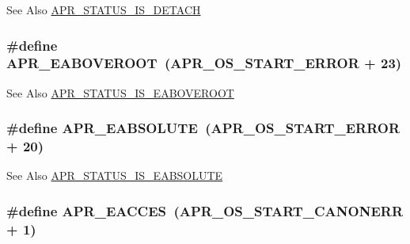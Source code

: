 \begin{DoxySeeAlso}{See Also}
\hyperlink{group___a_p_r___s_t_a_t_u_s___i_s_ga64d5d0a6bfe141a387dfdd430a38465b}{A\-P\-R\-\_\-\-S\-T\-A\-T\-U\-S\-\_\-\-I\-S\-\_\-\-D\-E\-T\-A\-C\-H} 
\end{DoxySeeAlso}
\hypertarget{group___a_p_r___error_ga4828cc04f97dc7bed691456adf7c073e}{
\subsubsection[{A\-P\-R\-\_\-\-E\-A\-B\-O\-V\-E\-R\-O\-O\-T}]{\setlength{\rightskip}{0pt plus 5cm}\#define A\-P\-R\-\_\-\-E\-A\-B\-O\-V\-E\-R\-O\-O\-T~({\bf A\-P\-R\-\_\-\-O\-S\-\_\-\-S\-T\-A\-R\-T\-\_\-\-E\-R\-R\-O\-R} + 23)}}\label{group___a_p_r___error_ga4828cc04f97dc7bed691456adf7c073e}
\begin{DoxySeeAlso}{See Also}
\hyperlink{group___a_p_r___s_t_a_t_u_s___i_s_gae89b8de1e40b855cf95987ce5947b442}{A\-P\-R\-\_\-\-S\-T\-A\-T\-U\-S\-\_\-\-I\-S\-\_\-\-E\-A\-B\-O\-V\-E\-R\-O\-O\-T} 
\end{DoxySeeAlso}
\hypertarget{group___a_p_r___error_gafd1ffc5bf2bf215ad048780408913d0e}{
\subsubsection[{A\-P\-R\-\_\-\-E\-A\-B\-S\-O\-L\-U\-T\-E}]{\setlength{\rightskip}{0pt plus 5cm}\#define A\-P\-R\-\_\-\-E\-A\-B\-S\-O\-L\-U\-T\-E~({\bf A\-P\-R\-\_\-\-O\-S\-\_\-\-S\-T\-A\-R\-T\-\_\-\-E\-R\-R\-O\-R} + 20)}}\label{group___a_p_r___error_gafd1ffc5bf2bf215ad048780408913d0e}
\begin{DoxySeeAlso}{See Also}
\hyperlink{group___a_p_r___s_t_a_t_u_s___i_s_gae662804298416a68e63c4f84f245d30c}{A\-P\-R\-\_\-\-S\-T\-A\-T\-U\-S\-\_\-\-I\-S\-\_\-\-E\-A\-B\-S\-O\-L\-U\-T\-E} 
\end{DoxySeeAlso}
\hypertarget{group___a_p_r___error_ga407fc0ea7ead60f7a97fb9d70061bd41}{
\subsubsection[{A\-P\-R\-\_\-\-E\-A\-C\-C\-E\-S}]{\setlength{\rightskip}{0pt plus 5cm}\#define A\-P\-R\-\_\-\-E\-A\-C\-C\-E\-S~({\bf A\-P\-R\-\_\-\-O\-S\-\_\-\-S\-T\-A\-R\-T\-\_\-\-C\-A\-N\-O\-N\-E\-R\-R} + 1)}}\label{group___a_p_r___error_ga407fc0ea7ead60f7a97fb9d70061bd41}
